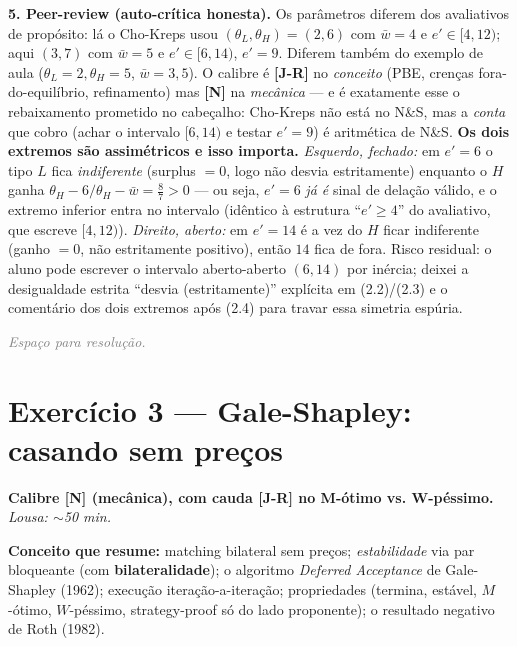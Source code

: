 \documentclass[11pt,a4paper]{article}
\newcommand{\calY}{\textbf{\textcolor{amarelo}{[N]}}} %
\newcommand{\calR}{\textbf{\textcolor{verm}{[J-R]}}}  %
\newcommand{\dc}[2]{#1{,}#2}
\newcommand{\passo}[1]{\smallskip\noindent\textbf{\textcolor{insper}{#1}}\quad}
\newcommand{\espacoaluno}[1]{%
  \par\smallskip\noindent\textit{\textcolor{gray}{Espaço para resolução.}}%
  \par\vspace{#1}\noindent\textcolor{insper!30}{\hrulefill}\par\medskip}
\begin{document}
\begin{gabarito}
\passo{5. Peer-review (auto-crítica honesta).} Os parâmetros diferem dos avaliativos de
propósito: lá o Cho-Kreps usou $(\theta_L,\theta_H)=(2,6)$ com $\bar w=4$ e $e'\in[4,12)$; aqui
$(3,7)$ com $\bar w=5$ e $e'\in[6,14)$, $e'=9$. Diferem também do exemplo de aula
($\theta_L=2,\theta_H=5$, $\bar w=\dc{3}{5}$). O calibre é \calR{} no \emph{conceito} (PBE,
crenças fora-do-equilíbrio, refinamento) mas \calY{} na \emph{mecânica} — e é exatamente esse
o rebaixamento prometido no cabeçalho: Cho-Kreps não está no N\&S, mas a \emph{conta} que cobro
(achar o intervalo $[6,14)$ e testar $e'=9$) é aritmética de N\&S. \textbf{Os dois extremos
são assimétricos e isso importa.} \emph{Esquerdo, fechado:} em $e'=6$ o tipo $L$ fica
\emph{indiferente} (surplus $=0$, logo não desvia estritamente) enquanto o $H$ ganha
$\theta_H-6/\theta_H-\bar w=\tfrac{8}{7}>0$ — ou seja, $e'=6$ \emph{já é} sinal de delação
válido, e o extremo inferior entra no intervalo (idêntico à estrutura ``$e'\ge 4$'' do
avaliativo, que escreve $[4,12)$). \emph{Direito, aberto:} em $e'=14$ é a vez do $H$ ficar
indiferente (ganho $=0$, não estritamente positivo), então $14$ fica de fora. Risco residual:
o aluno pode escrever o intervalo aberto-aberto $(6,14)$ por inércia; deixei a desigualdade
estrita ``desvia (estritamente)'' explícita em (2.2)/(2.3) e o comentário dos dois extremos
após (2.4) para travar essa simetria espúria.
\end{gabarito}
\else
\espacoaluno{85mm}
\fi

\hrulefill

\section*{\textcolor{insper}{Exercício 3 — Gale-Shapley: casando sem preços}}
\noindent\textbf{Calibre \calY{} (mecânica), com cauda \calR{} no M-ótimo vs. W-péssimo.} \quad \emph{Lousa: $\sim$50 min.}
\par\smallskip
\noindent\textbf{Conceito que resume:} matching bilateral sem preços; \emph{estabilidade} via
par bloqueante (com \textbf{bilateralidade}); o algoritmo \emph{Deferred Acceptance} de
Gale-Shapley (1962); execução iteração-a-iteração; propriedades (termina, estável, $M$-ótimo,
$W$-péssimo, strategy-proof só do lado proponente); o resultado negativo de Roth (1982).
\end{document}
